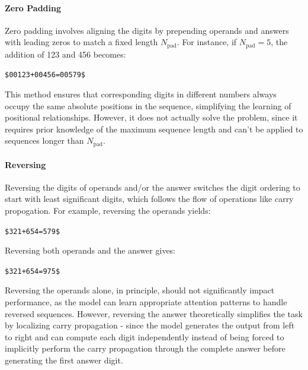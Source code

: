 \paragraph{Zero Padding}
Zero padding involves aligning the digits by prepending operands and answers with leading zeros to match a fixed length $N_\text{pad}$. For instance, if $N_\text{pad}=5$, the addition of 123 and 456 becomes:
\begin{center}
    \verb|$00123+00456=00579$|
\end{center}
This method ensures that corresponding digits in different numbers always occupy the same absolute positions in the sequence, simplifying the learning of positional relationships. However, it does not actually solve the problem, since it requires prior knowledge of the maximum sequence length and can't be applied to sequences longer than $N_\text{pad}$.

\paragraph{Reversing}
Reversing the digits of operands and/or the answer switches the digit ordering to start with least significant digits, which follows the flow of operations like carry propogation. For example, reversing the operands yields:
\begin{center}
    \verb|$321+654=579$|
\end{center}
Reversing both operands and the answer gives:
\begin{center}
    \verb|$321+654=975$|
\end{center}
Reversing the operands alone, in principle, should not significantly impact performance, as the model can learn appropriate attention patterns to handle reversed sequences. However, reversing the answer theoretically simplifies the task by localizing carry propagation - since the model generates the output from left to right and can compute each digit independently instead of being forced to implicitly perform the carry propagation through the complete answer before generating the first answer digit.

